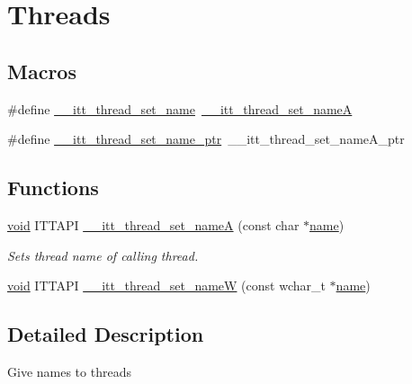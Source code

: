 \hypertarget{group__threads}{\section{Threads}
\label{group__threads}
}
\subsection*{Macros}
\begin{DoxyCompactItemize}
\item 
\#define \hyperlink{group__threads_gac8113cf8708e0d665fc9448a3e49c201}{\-\_\-\-\_\-itt\-\_\-thread\-\_\-set\-\_\-name}~\hyperlink{group__threads_ga9e8c213f65e14aef25280ed07df6c5e2}{\-\_\-\-\_\-itt\-\_\-thread\-\_\-set\-\_\-name\-A}
\item 
\#define \hyperlink{group__threads_ga995f602e830faca49bd119f4a1fe51d9}{\-\_\-\-\_\-itt\-\_\-thread\-\_\-set\-\_\-name\-\_\-ptr}~\-\_\-\-\_\-itt\-\_\-thread\-\_\-set\-\_\-name\-A\-\_\-ptr
\end{DoxyCompactItemize}
\subsection*{Functions}
\begin{DoxyCompactItemize}
\item 
\hyperlink{ittnotify__static_8h_af941d56e55e3c5465135b60c4d6343ed}{void} I\-T\-T\-A\-P\-I \hyperlink{group__threads_ga9e8c213f65e14aef25280ed07df6c5e2}{\-\_\-\-\_\-itt\-\_\-thread\-\_\-set\-\_\-name\-A} (const char $\ast$\hyperlink{ittnotify__static_8h_a1c34b35a4952969fef60192313bba34a}{name})
\begin{DoxyCompactList}\small\item\em Sets thread name of calling thread. \end{DoxyCompactList}\item 
\hyperlink{ittnotify__static_8h_af941d56e55e3c5465135b60c4d6343ed}{void} I\-T\-T\-A\-P\-I \hyperlink{group__threads_gad5d4b8808f625466329f1145e80eb4be}{\-\_\-\-\_\-itt\-\_\-thread\-\_\-set\-\_\-name\-W} (const wchar\-\_\-t $\ast$\hyperlink{ittnotify__static_8h_a1c34b35a4952969fef60192313bba34a}{name})
\end{DoxyCompactItemize}


\subsection{Detailed Description}
Give names to threads 

